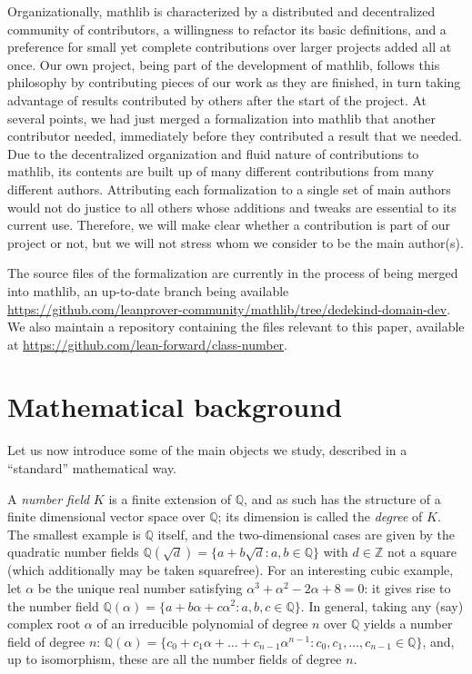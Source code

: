 \documentclass[a4paper,USenglish,cleveref, autoref, thm-restate]{lipics-v2021}
\newcommand{\mathlib}{\textsf{mathlib}\xspace}
\newcommand{\Q}{\mathbb{Q}}
\newcommand{\Z}{\mathbb{Z}}
\begin{document}
Organizationally, \mathlib is characterized by a distributed and decentralized community of contributors, a willingness to refactor its basic definitions, and a preference for small yet complete contributions over larger projects added all at once.
Our own project, being part of the development of \mathlib, follows this philosophy by contributing pieces of our work as they are finished,
in turn taking advantage of results contributed by others after the start of the project.
At several points, we had just merged a formalization into \mathlib that another contributor needed,
immediately before they contributed a result that we needed.
Due to the decentralized organization and fluid nature of contributions to \mathlib, its contents are built up of many different contributions from many different authors. Attributing each formalization to a single set of main authors would not do justice to all others whose additions and tweaks are essential to its current use. Therefore, we will make clear whether a contribution is part of our project or not, but we will not stress whom we consider to be the main author(s).

The source files of the formalization are currently in the process of being merged into \mathlib, an up-to-date branch being available \url{https://github.com/leanprover-community/mathlib/tree/dedekind-domain-dev}. We also maintain a %
repository containing the files relevant to this paper, available at \url{https://github.com/lean-forward/class-number}.

\section{Mathematical background}\label{sec math background}

Let us now introduce some of the main objects we study, described in a ``standard'' mathematical way.%

A \emph{number field} $K$ is a finite extension of $\Q$, and as such has the structure of a finite dimensional vector space over $\Q$; its dimension is called the \emph{degree} of $K$.
The smallest example is $\Q$ itself, and the two-dimensional cases are given by the quadratic number fields
$\Q(\sqrt{d})=\{a+b\sqrt{d} : a,b \in \Q\}$
with $d \in \Z$ not a square (which additionally may be taken squarefree).
For an interesting cubic example, let $\alpha$ be the unique real number satisfying $\alpha^3 + \alpha^2 - 2\alpha + 8=0$: it gives rise to the number field
$\Q(\alpha)=\{a+b\alpha+c \alpha^2: a,b,c \in \Q\}$.
In general, taking any (say) complex root $\alpha$ of an irreducible polynomial of degree $n$ over $\Q$ yields a number field of degree $n$:
$\Q(\alpha)=\{c_0+c_1\alpha+\ldots+c_{n-1} \alpha^{n-1} : c_0,c_1,\ldots,c_{n-1} \in \Q \}$,
and, up to isomorphism, these are all the number fields of degree $n$.
\end{document}
